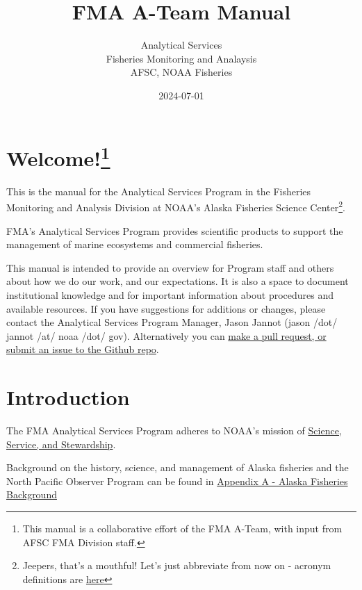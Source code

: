 \documentclass[
  letterpaper,
  DIV=11,
  numbers=noendperiod]{scrreprt}
\title{FMA A-Team Manual}
\author{Analytical Services\\
Fisheries Monitoring and Analaysis\\
AFSC, NOAA Fisheries}
\date{2024-07-01}
\renewcommand*\contentsname{Table of contents}
\newcommand\contentsname{Table of contents}
\begin{document}
\maketitle

\renewcommand*\contentsname{Table of contents}
{
\hypersetup{linkcolor=}
\setcounter{tocdepth}{2}
\tableofcontents
}

\chapter[Welcome!]{\texorpdfstring{Welcome!\footnote{This manual is a
  collaborative effort of the FMA A-Team, with input from AFSC FMA
  Division staff.}}{Welcome!}}\label{welcome}

This is the manual for the Analytical Services Program in the Fisheries
Monitoring and Analysis Division at NOAA's Alaska Fisheries Science
Center\footnote{Jeepers, that's a mouthful! Let's just abbreviate from
  now on - acronym definitions are \hyperref[sec-acronyms]{here}}.

FMA's Analytical Services Program provides scientific products to
support the management of marine ecosystems and commercial fisheries.

This manual is intended to provide an overview for Program staff and
others about how we do our work, and our expectations. It is also a
space to document institutional knowledge and for important information
about procedures and available resources. If you have suggestions for
additions or changes, please contact the Analytical Services Program
Manager, Jason Jannot (jason /dot/ jannot /at/ noaa /dot/ gov).
Alternatively you can
\href{https://github.com/jjannot-NOAA/ateam-manual}{make a pull request,
or submit an issue to the Github repo}.


\chapter{Introduction}\label{intro}

The FMA Analytical Services Program adheres to NOAA's mission of
\href{https://www.noaa.gov/our-mission-and-vision}{Science, Service, and
Stewardship}.

Background on the history, science, and management of Alaska fisheries
and the North Pacific Observer Program can be found in
\href{fishery-background.qmd}{Appendix A - Alaska Fisheries Background}
\end{document}
